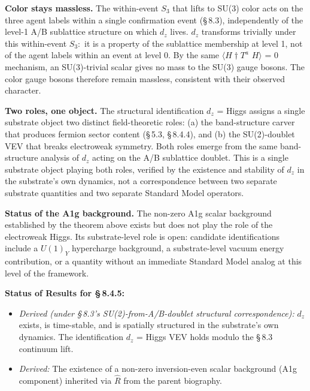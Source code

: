 \documentclass[11pt,oneside]{report}
\theoremstyle{definition}
\theoremstyle{remark}
\begin{document}
\textbf{Color stays massless.} The within-event \ensuremath{S_{3}} that lifts to SU(3)
color acts on the three agent labels within a single confirmation event
(\S\,8.3), independently of the level-1 A/B sublattice structure on which
\ensuremath{d_{z}} lives. \ensuremath{d_{z}} transforms trivially under this within-event \ensuremath{S_{3}:} it is
a property of the sublattice membership at level 1, not of the agent
labels within an event at level 0. By the same \ensuremath{\langle H\dagger T^{a}} \ensuremath{H\rangle} = 0
mechanism, an SU(3)-trivial scalar gives no mass to the SU(3) gauge
bosons. The color gauge bosons therefore remain massless, consistent
with their observed character.

\textbf{Two roles, one object.} The structural identification \ensuremath{d_{z}} =
Higgs assigns a single substrate object two distinct field-theoretic
roles: (a) the band-structure carver that produces fermion sector
content (\S\,5.3, \S\,8.4.4), and (b) the SU(2)-doublet VEV that breaks
electroweak symmetry. Both roles emerge from the same band-structure
analysis of \ensuremath{d_{z}} acting on the A/B sublattice doublet. This is a single
substrate object playing both roles, verified by the existence and
stability of \ensuremath{d_{z}} in the substrate's own dynamics, not a correspondence
between two separate substrate quantities and two separate Standard
Model operators.

\textbf{Status of the A1g background.} The non-zero A1g scalar
background established by the theorem above exists but does not play the
role of the electroweak Higgs. Its substrate-level role is open:
candidate identifications include a \ensuremath{U(1)_{Y}} hypercharge background, a
substrate-level vacuum energy contribution, or a quantity without an
immediate Standard Model analog at this level of the framework.

\textbf{Status of Results for \S\,8.4.5:}

\begin{itemize}
\item
  \emph{Derived (under \S\,8.3's SU(2)-from-A/B-doublet structural
  correspondence):} \ensuremath{d_{z}} exists, is time-stable, and is spatially
  structured in the substrate's own dynamics. The identification \ensuremath{d_{z}} =
  Higgs VEV holds modulo the \S\,8.3 continuum lift.
\end{itemize}

\begin{itemize}
\item
  \emph{Derived:} The existence of a non-zero inversion-even scalar
  background (A1g component) inherited via \ensuremath{\hat{R}} from the parent biography.
\end{itemize}
\end{document}
